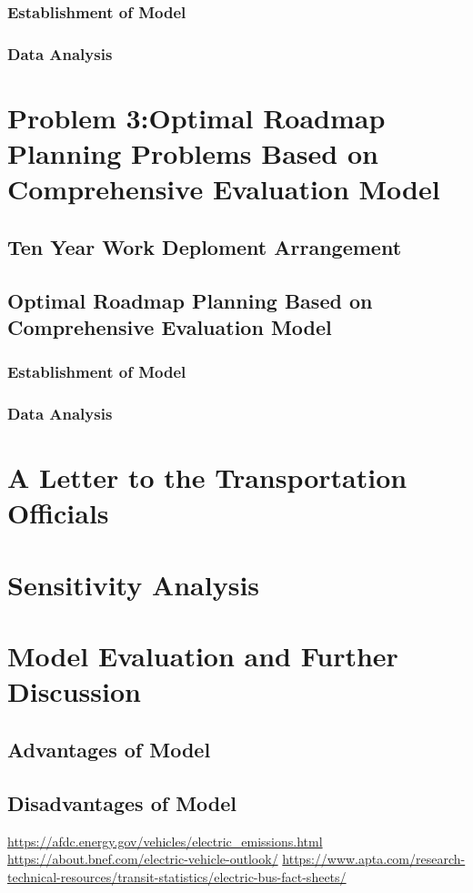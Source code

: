 \documentclass[12pt]{article}
\begin{document}
\subsubsection{Establishment of Model}
\subsubsection{Data Analysis}

\section{Problem 3:Optimal Roadmap Planning Problems Based on Comprehensive Evaluation Model}
\subsection{Ten Year Work Deploment Arrangement}
\subsection{Optimal Roadmap Planning Based on Comprehensive Evaluation Model}
\subsubsection{Establishment of Model}
\subsubsection{Data Analysis}


\newpage
\section{A Letter to the Transportation Officials}
\lipsum[1-2]

\section{Sensitivity Analysis}
\lipsum[1-2]


\section{Model Evaluation and Further Discussion}

\subsection{Advantages of Model}

\subsection{Disadvantages of Model}


\newpage
\begin{thebibliography}{100}
\url{https://afdc.energy.gov/vehicles/electric_emissions.html}
\url{https://about.bnef.com/electric-vehicle-outlook/}
\url{https://www.apta.com/research-technical-resources/transit-statistics/electric-bus-fact-sheets/}
\end{thebibliography}
\end{document}
